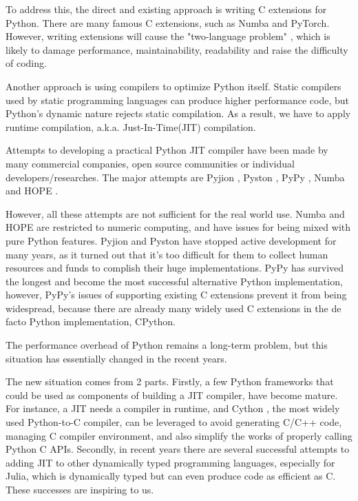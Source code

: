 \documentclass[conference]{IEEEtran}
\begin{document}
To address this, the direct and existing approach is writing C extensions for Python.
There are many famous C extensions, such as Numba and PyTorch. However, writing extensions will cause the "two-language problem" \cite {bezanson2017julia},
which is likely to damage performance, maintainability, readability and raise the difficulty of coding.

Another approach is using compilers to optimize Python itself.
Static compilers used by static programming languages can produce higher performance code, but Python's dynamic nature rejects static
compilation. As a result, we have to apply runtime compilation, a.k.a. Just-In-Time(JIT) compilation.

Attempts to developing a practical Python JIT compiler have been made by many commercial companies, open source communities or individual developers/researches.
The major attempts are Pyjion \cite {pyjion:2018}, Pyston \cite {pyston:2017}, PyPy \cite {bolz2009tracing},
Numba \cite {lam2015numba} and HOPE \cite {akeret2015hope}.

However, all these attempts are not sufficient for the real world use. Numba and HOPE are restricted to numeric computing, and have issues for being mixed with pure Python features.
Pyjion and Pyston have stopped active development for many years, as it turned out that it's too difficult for them to collect human resources and funds to complish their huge implementations.
PyPy has survived the longest and become the most successful alternative Python implementation, however, PyPy's issues of supporting existing C extensions prevent it from being widespread, because there are already many widely used C extensions in the de facto Python implementation, CPython. 

The performance overhead of Python remains a long-term problem, but this situation has essentially changed in the recent years.

The new situation comes from 2 parts. Firstly, a few Python frameworks that could be used as components of building a JIT compiler, have become mature.
For instance, a JIT needs a compiler in runtime, and Cython \cite {behnel2011cython}, the most widely used Python-to-C compiler, can be leveraged to avoid generating C/C++ code, managing C compiler environment,
and also simplify the works of properly calling Python C APIs. Secondly, in recent years there are several successful attempts to adding JIT to other dynamically typed programming languages, especially for Julia,
which is dynamically typed but can even produce code as efficient as C. These successes are inspiring to us. 
\end{document}
